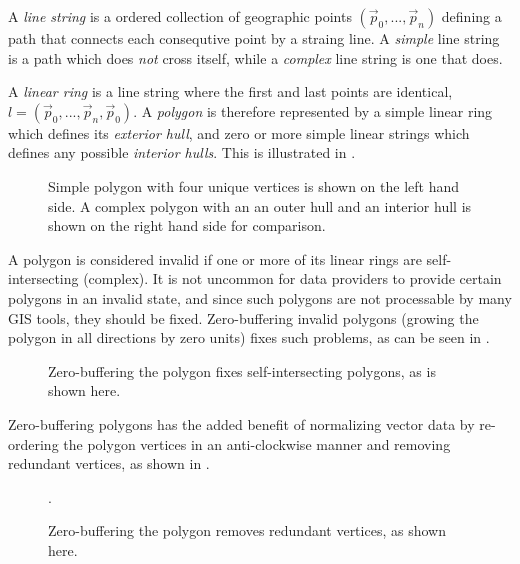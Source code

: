 A \textit{line string} is a ordered collection of geographic points $(\vec{p}_0, ..., \vec{p}_n)$ defining a path that connects each consequtive point by a straing line.
A \textit{simple} line string is a path which does \textit{not} cross itself, while a \textit{complex} line string is one that does.

A \textit{linear ring} is a line string where the first and last points are identical, $l = (\vec{p}_0, ..., \vec{p}_n, \vec{p}_0)$.
A \textit{polygon} is therefore represented by a simple linear ring which defines its \textit{exterior hull}, and zero or more simple linear strings which defines any possible \textit{interior hulls}.
This is illustrated in .

\begin{figure}[htb]
  \centering
  
  \textcolor{gray}{\vrule}
  \hspace{0.01\linewidth}
  
  \caption{
    Simple polygon with four unique vertices is shown on the left hand side.
    A complex polygon with an an outer hull
    and an interior hull is shown on the right hand side for comparison.
  }
  \label{fig:polygon-representation}
\end{figure}

A polygon is considered invalid if one or more of its linear rings are self-intersecting (complex).
It is not uncommon for data providers to provide certain polygons in an invalid state, and since such polygons are not processable by many GIS tools, they should be fixed.
Zero-buffering invalid polygons (growing the polygon in all directions by zero units) fixes such problems, as can be seen in .

\begin{figure}[H]
  \centering
  
  \caption{Zero-buffering the polygon fixes self-intersecting polygons, as is shown here.}
  \label{fig:complex-zero-buffer}
\end{figure}

Zero-buffering polygons has the added benefit of normalizing vector data by re-ordering the polygon vertices in an anti-clockwise manner and removing redundant vertices, as shown in .

\begin{figure}[H]
  \centering
  
  \caption{Zero-buffering the polygon removes redundant vertices, as shown here.}
  \label{fig:redundant-zero-buffer}.
\end{figure}

